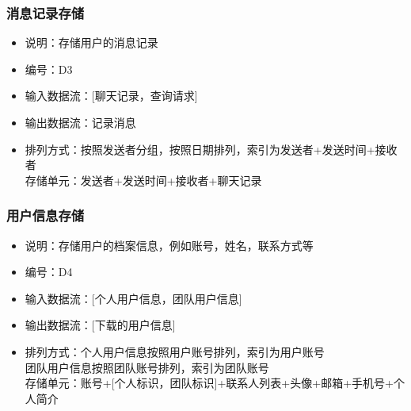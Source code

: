 \begin{itemize}
            \subsubsection{消息记录存储}
            \begin{itemize}
                \item 说明：存储用户的消息记录
                \item 编号：D3
                \item 输入数据流：[聊天记录，查询请求]
                \item 输出数据流：记录消息
                \item 排列方式：按照发送者分组，按照日期排列，索引为发送者+发送时间+接收者\\
                         存储单元：发送者+发送时间+接收者+聊天记录\\
            \end{itemize}
            \subsubsection{用户信息存储}
            \begin{itemize}
                \item 说明：存储用户的档案信息，例如账号，姓名，联系方式等
                \item 编号：D4
                \item 输入数据流：[个人用户信息，团队用户信息]
                \item 输出数据流：[下载的用户信息]
                \item 排列方式：个人用户信息按照用户账号排列，索引为用户账号\\
                               团队用户信息按照团队账号排列，索引为团队账号\\
                               存储单元：账号+[个人标识，团队标识]+联系人列表+头像+邮箱+手机号+个人简介\\
            \end{itemize}

\end{itemize}
